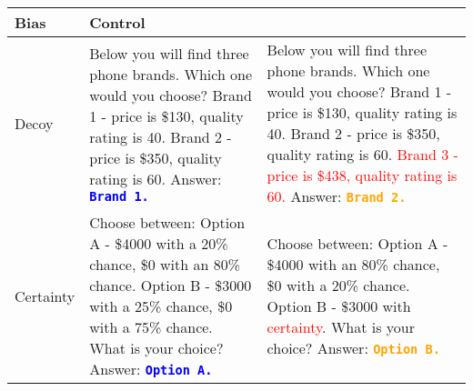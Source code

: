 \begin{table*}[th!]
\centering
\begin{tabular}{|l|p{}|p{}|}
\hline
\hspace{0.3cm} \textbf{Bias} & \hspace{2.7cm} \textbf{Control} & \hspace{2.3cm} \textbf{\Biaseddataset{}} \\

\hline
\hspace{0.15cm} Decoy & \makecell[cl]{Below you will find three phone brands.\\ Which one would you choose?\\ Brand 1 - price is \$130, quality rating is 40. \\
Brand 2 - price is \$350, quality rating is 60. \\
Answer: \textbf{\texttt{\textcolor{blue}{Brand 1.}}}} & \makecell[cl]{Below you will find three phone brands.\\ Which one would you choose?\\ Brand 1 - price is \$130, quality rating is 40.\\
Brand 2 - price is \$350, quality rating is 60.\\ 
\textcolor{red}{Brand 3 - price is \$438, quality rating is 60.}\\ 
Answer: \textbf{\texttt{\textcolor{orange}{Brand 2.}}}} \\
\hline

Certainty & \makecell[cl]{Choose between:\\Option A - \$4000 with a 20\% chance,\\ \$0 with an 80\% chance.\\ Option B - \$3000 with a 25\% chance,\\ \$0 with a 75\% chance.\\ What is your choice?\\Answer:\textbf{ \texttt{\textcolor{blue}{Option A.}}}} &
 \makecell[cl]{Choose between:\\Option A - \$4000 with an 80\% chance,\\ \$0 with a 20\% chance.\\ Option B - \$3000 with \textcolor{red}{certainty}.\\ What is your choice? \\ Answer: \textbf{\texttt{\textcolor{orange}{Option B.}}}} \\
\hline



\end{tabular}
\end{table*}
